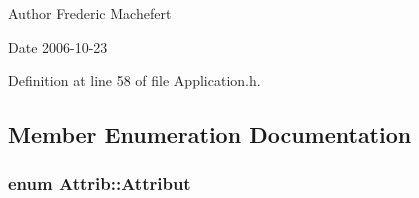 \begin{DoxyAuthor}{Author}
Frederic Machefert 
\end{DoxyAuthor}
\begin{DoxyDate}{Date}
2006-\/10-\/23 
\end{DoxyDate}


Definition at line 58 of file Application.h.

\subsection{Member Enumeration Documentation}
\hypertarget{classAttrib_a69e171d7cc6417835a5a306d3c764235}{
\subsubsection[{Attribut}]{\setlength{\rightskip}{0pt plus 5cm}enum {\bf Attrib::Attribut}}}
\label{classAttrib_a69e171d7cc6417835a5a306d3c764235}

